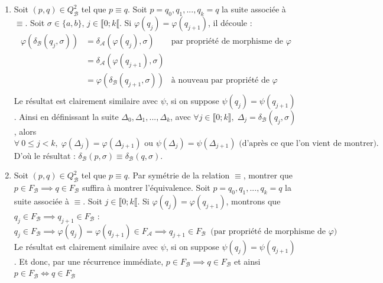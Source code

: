 \documentclass{article}
\begin{document}
\begin{enumerate}
        \item \label{itm:transition} Soit $(p, q) \in Q_\mathcal{B}^2$ tel que $p \equiv q$. Soit $p = q_0, q_1, ..., q_k = q$ la suite associée à $\equiv$. \newline 
        Soit $\sigma \in \{a , b \}$, $j \in \llbracket 0;k \llbracket$. Si $\varphi(q_j) = \varphi(q_{j + 1})$, il découle :
        \begin{align*}
            \varphi(\delta_\mathcal{B}(q_j, \sigma)) &= \delta_\mathcal{A}(\varphi(q_j), \sigma) & \text{par propriété de morphisme de $\varphi$} \\
                                                    &= \delta_\mathcal{A}(\varphi(q_{j + 1}), \sigma) \\
                                                    &= \varphi(\delta_\mathcal{B}(q_{j + 1}, \sigma)) & \text{à nouveau par propriété de $\varphi$} \\
        \end{align*}
        Le résultat est clairement similaire avec $\psi$, si on suppose $\psi(q_j) = \psi(q_{j + 1})$. \newline
        Ainsi en définissant la suite $\Delta_0,\Delta_1, ..., \Delta_k$, avec $\forall j \in \llbracket 0 ; k \rrbracket, \; \Delta_j = \delta_\mathcal{B}(q_j, \sigma)$, alors
        \begin{equation*}
            \forall \: 0 \leq j < k, \; \varphi(\Delta_j) = \varphi(\Delta_{j + 1}) \text{ ou } \psi(\Delta_j) = \psi(\Delta_{j + 1}) \text{ (d'après ce que l'on vient de montrer).}
        \end{equation*}
        D'où le résultat : $\boxed{\delta_\mathcal{B}(p, \sigma) \equiv \delta_\mathcal{B}(q, \sigma)}$.

    \item \label{itm:final} Soit $(p, q) \in Q_\mathcal{B}^2$ tel que $p \equiv q$. Par symétrie de la relation $\equiv$, montrer que $ p \in F_\mathcal{B} \implies q \in F_\mathcal{B}$ suffira à montrer l'équivalence. \newline 
    Soit $p = q_0, q_1, ..., q_k = q$ la suite associée à $\equiv$. \newline
    Soit $j \in \llbracket 0;k \llbracket$. Si $\varphi(q_j) = \varphi(q_{j + 1})$, montrons que $q_j \in F_\mathcal{B} \implies q_{j + 1} \in F_\mathcal{B}$ : 
    \begin{equation*}
        q_j \in F_\mathcal{B} \implies \varphi(q_j) = \varphi(q_{j + 1}) \in F_\mathcal{A} \implies q_{j + 1} \in F_\mathcal{B} \;\; \text{(par propriété de morphisme de $\varphi$)}
    \end{equation*}
    Le résultat est clairement similaire avec $\psi$, si on suppose $\psi(q_j) = \psi(q_{j + 1})$. \newline
    Et donc, par une récurrence immédiate, $p \in F_\mathcal{B} \implies q \in F_\mathcal{B}$ et ainsi $\boxed{p \in F_\mathcal{B} \Longleftrightarrow q \in F_\mathcal{B}}$


\end{enumerate}
\end{document}
